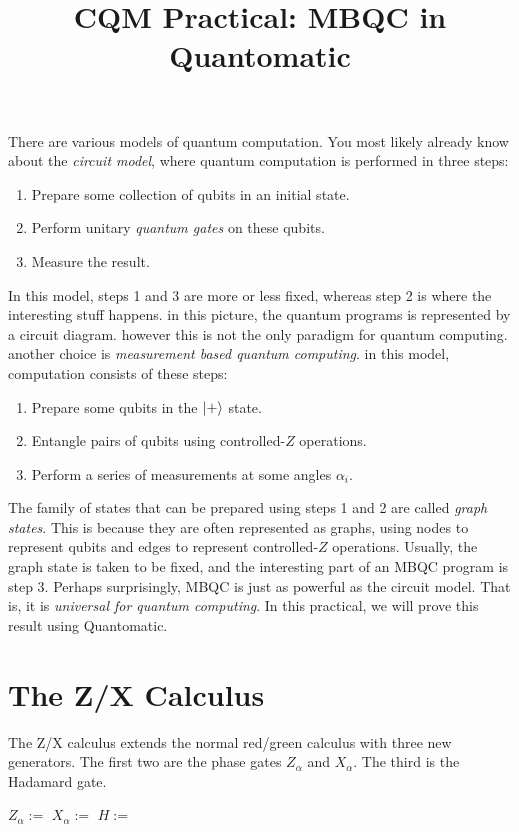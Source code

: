 \documentclass{article}
\title{CQM Practical: MBQC in Quantomatic}
\begin{document}
\maketitle

There are various models of quantum computation. You most likely already know about the \textit{circuit model}, where quantum computation is performed in three steps:

\begin{enumerate}
  \item Prepare some collection of qubits in an initial state.
  \item Perform unitary \textit{quantum gates} on these qubits.
  \item Measure the result.
\end{enumerate}

In this model, steps 1 and 3 are more or less fixed, whereas step 2 is where the interesting stuff happens. in this picture, the quantum programs is represented by a circuit diagram. however this is not the only paradigm for quantum computing. another choice is \textit{measurement based quantum computing}. in this model, computation consists of these steps:

\begin{enumerate}
  \item Prepare some qubits in the $\left| + \right\rangle$ state.
  \item Entangle pairs of qubits using controlled-$Z$ operations.
  \item Perform a series of measurements at some angles $\alpha_i$.
\end{enumerate}

The family of states that can be prepared using steps 1 and 2 are called \textit{graph states}. This is because they are often represented as graphs, using nodes to represent qubits and edges to represent controlled-$Z$ operations. Usually, the graph state is taken to be fixed, and the interesting part of an MBQC program is step 3. Perhaps surprisingly, MBQC is just as powerful as the circuit model. That is, it is \textit{universal for quantum computing}. In this practical, we will prove this result using Quantomatic.

\section{The Z/X Calculus}

The Z/X calculus extends the normal red/green calculus with three new generators. The first two are the phase gates $Z_\alpha$ and $X_\alpha$. The third is the Hadamard gate.
\begin{center}
    $Z_\alpha :=$ 
    \qquad\qquad
    $X_\alpha :=$ 
    \qquad\qquad
    $H := $ 
\end{center}
\end{document}
